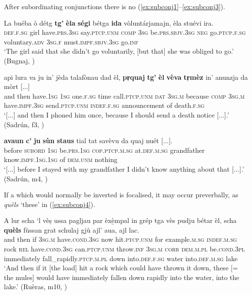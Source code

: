 After subordinating conjunctions there is no  (\ref{ex:subconj1}--\ref{ex:subconj3}).

\ea
\label{ex:subconj1}
\gll    La buéba ò détg \textbf{tg'} \textbf{èla} \textbf{ségi} bétga \textbf{ida} vòluntárjamajn, èla stuévi ira.\\
\textsc{def.f.sg} girl have.\textsc{prs.3sg} say.\textsc{ptcp.unm} \textsc{comp} \textsc{3sg} be.\textsc{prs.sbjv.3sg} \textsc{neg} go.\textsc{ptcp.f.sg} voluntary.\textsc{adv} \textsc{3sg.f} must.\textsc{impf.sbjv.3sg} go.\textsc{inf}\\
\glt `The girl said that she didn't go voluntarily, [but that] she was obliged to go.' (Bugnaj, \citealt[132]{Büchli1966})
\z

\ea
\label{ex:subconj2}
\gll  [...] api lura va ju in’ jèda talafònau dad èl, \textbf{pr̩quaj} \textbf{tg'} \textbf{èl} \textbf{vèva} \textbf{tr̩mèz} in’ anunzja da mòrt [...]\\
{} and then have.\textsc{1sg}  \textsc{1sg} one.\textsc{f.sg} time call.\textsc{ptcp.unm} \textsc{dat} \textsc{3sg.m} because \textsc{comp} \textsc{3sg.m} have.\textsc{impf.3sg} send.\textsc{ptcp.unm} \textsc{indef.f.sg} announcement of death.\textsc{f.sg}\\ 
\glt `[...] and then I phoned him once, because I should send a death notice [...].' (Sadrún, f3, )
\z

\ea
\label{ex:subconj3}
\gll  [...] \textbf{avaun} \textbf{c’} \textbf{ju} \textbf{sùn} \textbf{staus} tial tat savèvu da quaj nuét [...].\\
{} before \textsc{subord} \textsc{1sg} be.\textsc{prs.1sg} \textsc{cop.ptcp.m.sg} at.\textsc{def.m.sg} grandfather know.\textsc{impf.1sg.1sg} of \textsc{dem.unm} nothing\\
\glt `[...] before I stayed with my grandfather I didn’t know anything about that [...].' (Sadrún, m4, )
\z

If a  which would normally be inverted is focalised, it may occur preverbally, as \textit{quèls} `these' in (\ref{ex:subconj4}).

\ea
\label{ex:subconj4}
\gll   A lur scha `l vèṣ ussa pagljau par èxè̱mpal in grép tga vès pudju bétar èl, scha \textbf{quèls} fùssan grat schulaj gjù ajl’ aua, ajl lac.\\
and then if \textsc{3sg.m} have.\textsc{cond.3sg} now hit.\textsc{ptcp.unm} for example.\textsc{m.sg} \textsc{indef.m.sg} rock \textsc{rel} have.\textsc{cond.3sg} can.\textsc{ptcp.unm} throw.\textsc{inf} \textsc{3sg.m} \textsc{corr} \textsc{dem.m.pl} be.\textsc{cond.3pl} immediately fall\_rapidly.\textsc{ptcp.m.pl} down into.\textsc{def.f.sg} water into.\textsc{def.m.sg} lake\\
\glt `And then if it [the load] hit a rock which could have thrown it down, these [= the mules] would have immediately fallen down rapidly into the water, into the lake.' (Ruèras, m10, )
\z

